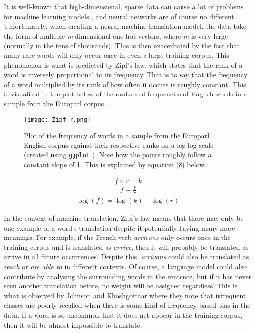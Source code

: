 \documentclass[11pt]{article}
\begin{document}
It is well-known that high-dimensional, sparse data can cause a lot of problems for machine learning models \citep{sparse}, and neural networks are of course no different. Unfortunately, when creating a neural machine translation model, the data take the form of multiple \textit{m}-dimensional one-hot vectors, where \textit{m} is very large (normally in the tens of thousands). This is then exacerbated by the fact that many rare words will only occur once in even a large training corpus. This phenomenon is what is predicted by Zipf’s law, which states that the rank of a word is inversely proportional to its frequency. That is to say that the frequency of a word multiplied by its rank of how often it occurs is roughly constant. This is visualised in the plot below of the ranks and frequencies of English words in a sample from the Europarl corpus \citep{koehn2005europarl}.

\begin{figure}[h]
    \centering
    \texttt{[image: Zipf\_r.png]}
    \caption{Plot of the frequency of words in a sample from the Europarl English corpus against their respective ranks on a log-log scale (created using \texttt{ggplot} \citep{ggplot}). Note how the points roughly follow a constant slope of 1. This is explained by equation (8) below.}
    \label{fig:my_label}
\end{figure}

\begin{align}
    f \times r = k \nonumber
\end{align}
\begin{align}    
    f = \frac{k}{r}
\end{align}
\begin{align}
    \log(f) = \log(k) - \log(r) \nonumber
\end{align}

\bigskip

In the context of machine translation, Zipf’s law means that there may only be one example of a word’s translation despite it potentially having many more meanings. For example, if the French verb \textit{arrivons} only occurs once in the training corpus and is translated as \textit{arrive}, then it will probably be translated as arrive in all future occurrences. Despite this, \textit{arrivons} could also be translated as \textit{reach} or \textit{are able to} in different contexts. Of course, a language model could also contribute by analysing the surrounding words in the sentence, but if it has never seen another translation before, no weight will be assigned regardless. This is what is observed by Johnson and Khoshgoftaar \citeyearpar{johnson2019survey} where they note that infrequent classes are poorly recalled when there is some kind of frequency-based bias in the data. If a word is so uncommon that it does not appear in the training corpus, then it will be almost impossible to translate.
\end{document}
